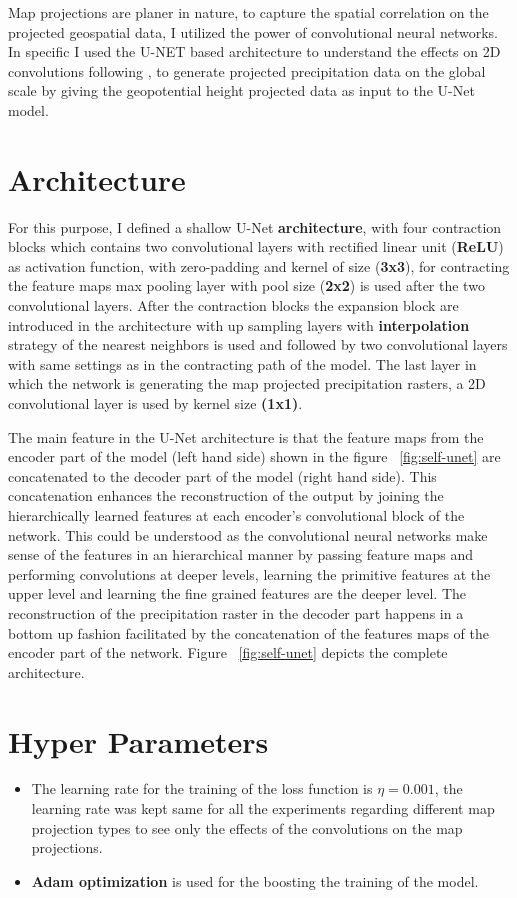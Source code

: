Map projections are planer in nature, to capture the spatial correlation on the projected geospatial data, I utilized the power of convolutional neural networks.
In specific I used the U-NET \cite{ronneberger2015unet}  based architecture to understand the effects on 2D convolutions following \cite{trebing2021smaatunet}, to generate projected precipitation data on the global scale by giving the geopotential height projected data as input to the U-Net model.

\section{Architecture}
For this purpose, I defined a shallow U-Net \textbf{architecture}, with four contraction blocks which contains two convolutional layers with rectified linear unit (\textbf{ReLU})
as activation function, with zero-padding and kernel of size (\textbf{3x3}), for contracting the feature maps max pooling layer with pool size (\textbf{2x2}) is used after the two
convolutional layers.
After the contraction blocks the expansion block are introduced in the architecture with up sampling layers with \textbf{interpolation} strategy of the nearest neighbors is used
and followed by two convolutional layers with same settings as in the contracting path of the model.
The last layer in which the network is generating the map projected precipitation rasters, a 2D convolutional layer is used by kernel size  \textbf{(1x1)}.

The main feature in the U-Net architecture is that the feature maps from the encoder part of the model (left hand side) shown in the figure ~\ref{fig:self-unet} are concatenated to the decoder part of the model (right hand side).
This concatenation enhances the reconstruction of the output by joining the hierarchically learned features at each encoder's convolutional block of the network. This could be
understood as the convolutional neural networks make sense of the features in an hierarchical manner by passing feature maps and performing convolutions at deeper levels,
learning the primitive features at the upper level and learning the fine grained features are the deeper level. The reconstruction of the precipitation raster in the decoder
part happens in a bottom up fashion facilitated by the concatenation of the features maps of the encoder part of the network. Figure ~\ref{fig:self-unet} depicts the complete architecture.

\section{Hyper Parameters}
\begin{itemize}
    \item The learning rate for the training of the loss function is $\eta = 0.001$, the learning rate was kept same for all the experiments regarding different map projection types to see only the effects of the convolutions on the map projections.
    \item \textbf{Adam optimization} is used for the boosting the training of the model.
\end{itemize}


